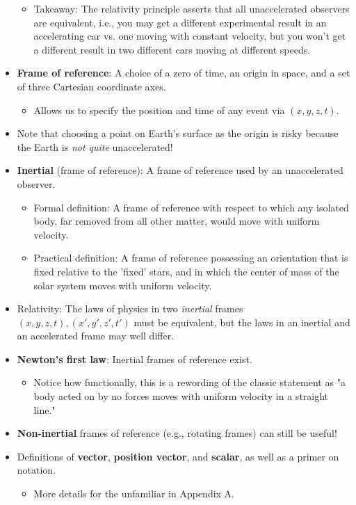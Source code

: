 \documentclass[../notes.tex]{subfiles}
\begin{document}
\begin{itemize}
\begin{itemize}
        \item Takeaway: The relativity principle asserts that all unaccelerated observers are equivalent, i.e., you may get a different experimental result in an accelerating car vs. one moving with constant velocity, but you won't get a different result in two different cars moving at different speeds.
    \end{itemize}
    \item \textbf{Frame of reference}: A choice of a zero of time, an origin in space, and a set of three Cartesian coordinate axes.
    \begin{itemize}
        \item Allows us to specify the position and time of any event via $(x,y,z,t)$.
    \end{itemize}
    \item Note that choosing a point on Earth's surface as the origin is risky because the Earth is \emph{not quite} unaccelerated!
    \item \textbf{Inertial} (frame of reference): A frame of reference used by an unaccelerated observer.
    \begin{itemize}
        \item Formal definition: A frame of reference with respect to which any isolated body, far removed from all other matter, would move with uniform velocity.
        \item Practical definition: A frame of reference possessing an orientation that is fixed relative to the 'fixed' stars, and in which the center of mass of the solar system moves with uniform velocity.
    \end{itemize}
    \item Relativity: The laws of physics in two \emph{inertial} frames $(x,y,z,t),(x',y',z',t')$ must be equivalent, but the laws in an inertial and an accelerated frame may well differ.
    \item \textbf{Newton's first law}: Inertial frames of reference exist.
    \begin{itemize}
        \item Notice how functionally, this is a rewording of the classic statement as "a body acted on by no forces moves with uniform velocity in a straight line."
    \end{itemize}
    \item \textbf{Non-inertial} frames of reference (e.g., rotating frames) can still be useful!
    \item Definitions of \textbf{vector}, \textbf{position vector}, and \textbf{scalar}, as well as a primer on notation.
    \begin{itemize}
        \item More details for the unfamiliar in Appendix A.
    \end{itemize}
\end{itemize}
\end{document}

